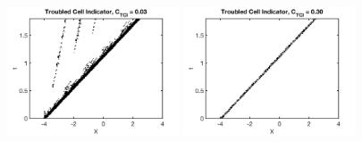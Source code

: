 \documentclass[letterpaper]{jpconf}
\begin{document}
\begin{figure}[h]
\begin{minipage}{18pc}
  \end{minipage} \\
  \begin{minipage}{12pc}
    \includegraphics[width=12pc]{./Figures/ShuOsher_TCI_0015_Astronum_2018}
  \end{minipage}\hspace{0.5pc}%
  \begin{minipage}{12pc}
    \includegraphics[width=12pc]{./Figures/ShuOsher_TCI_0150_Astronum_2018}
  \end{minipage}\hspace{0.5pc}
  \begin{minipage}{12pc}

\end{minipage}
\end{figure}
\end{document}
